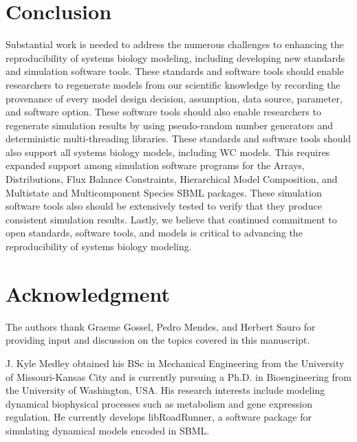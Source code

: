 \documentclass[journal,transmag,twoside]{IEEEtran}
\begin{document}
\section{Conclusion}

Substantial work is needed to address the numerous challenges to enhancing the reproducibility of systems biology modeling, including developing new standards and simulation software tools. These standards and software tools should enable researchers to regenerate models from our scientific knowledge by recording the provenance of every model design decision, assumption, data source, parameter, and software option. These software tools should also enable researchers to regenerate simulation results by using pseudo-random number generators and deterministic multi-threading libraries. These standards and software tools should also support all systems biology models, including WC models. This requires expanded support among simulation software programs for the Arrays, Distributions, Flux Balance Constraints, Hierarchical Model Composition, and Multistate and Multicomponent Species SBML packages. These simulation software tools also should be extensively tested to verify that they produce consistent simulation results. Lastly, we believe that continued commitment to open standards, software tools, and models is critical to advancing the reproducibility of systems biology modeling.

\section{Acknowledgment}

The authors thank Graeme Gossel, Pedro Mendes, and Herbert Sauro for providing input and discussion
on the topics covered in this manuscript.

\ifCLASSOPTIONcaptionsoff
  \newpage
\fi




\begin{IEEEbiography}{J. Kyle Medley}
obtained his BSc in Mechanical Engineering from the University of Missouri-Kansas City and
is currently pursuing a Ph.D. in Bioengineering from the University of Washington, USA.
His research interests include modeling dynamical biophysical processes such as
metabolism and gene expression regulation.
He currently develops libRoadRunner, a software package for simulating dynamical models encoded in SBML.
\end{IEEEbiography}
\end{document}
